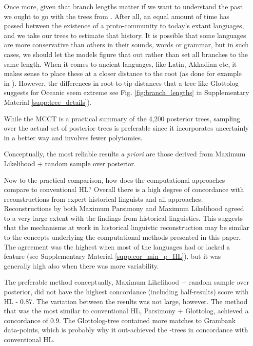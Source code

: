 \documentclass[12pt,letterpaper]{article}
\begin{document}
Once more, given that branch lengths matter if we want to understand the past we ought to go with the trees from \cite{grayetal_2009}. After all, an equal amount of time has passed between the existence of a proto-community to today's extant languages, and we take our trees to estimate that history. It is possible that some languages are more conservative than others in their sounds, words or grammar, but in such cases, we should let the models figure that out rather than set all branches to the same length. When it comes to ancient languages, like Latin, Akkadian etc, it makes sense to place these at a closer distance to the root (as done for example in \citet{carling2021reconstructing}). However, the differences in root-to-tip distances that a tree like Glottolog suggests for Oceanic seem extreme see Fig. \ref{fig:branch_lengths} in Supplementary Material \ref{supp:tree_details}). 

While the MCCT is a practical summary of the 4,200 posterior trees, sampling over the actual set of posterior trees is preferable since it incorporates uncertainly in a better way and involves fewer polytomies.

Conceptually, the most reliable results \emph{a priori} are those derived from Maximum Likelihood + random sample over posterior.

Now to the practical comparison, how does the computational approaches compare to conventional HL? Overall there is a high degree of concordance with reconstructions from expert historical linguists and all approaches. Reconstructions by both Maximum Parsimony and Maximum Likelihood agreed to a very large extent with the findings from historical linguistics. This suggests that the mechanisms at work in historical linguistic reconstruction may be similar to the concepts underlying the computational methods presented in this paper. The agreement was the highest when most of the languages had or lacked a feature (see Supplementary Material \ref{supp:cor_min_p_HL}), but it was generally high also when there was more variability.

The preferable method conceptually, Maximum Likelihood + random sample over \citet{grayetal_2009} posterior, did not have the highest concordance (including half-results) score with HL - 0.87. The variation between the results was not large, however. The method that was the most similar to conventional HL, Parsimony + Glottolog, achieved a concordance of 0.9. The Glottolog-tree contained more matches to Grambank data-points, which is probably why it out-achieved the \cite{grayetal_2009}-trees in concordance with conventional HL.
\end{document}
